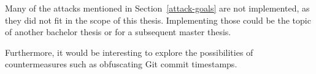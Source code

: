 Many of the attacks mentioned in Section~\ref{attack-goals} are not implemented, as they did not fit in the scope of this thesis.
Implementing those could be the topic of another bachelor thesis or for a subsequent master thesis.

Furthermore, it would be interesting to explore the possibilities of countermeasures such as obfuscating Git commit timestamps.
